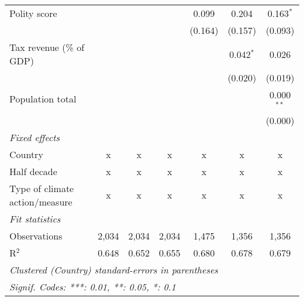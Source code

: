 \begin{tabular}{lcccccc}
   Polity score                                                   &               &                &                & 0.099          & 0.204          & 0.163$^{*}$\\   
                                                                  &               &                &                & (0.164)        & (0.157)        & (0.093)\\   
   Tax revenue (\% of GDP)                                        &               &                &                &                & 0.042$^{*}$    & 0.026\\   
                                                                  &               &                &                &                & (0.020)        & (0.019)\\   
   Population total                                               &               &                &                &                &                & 0.000$^{**}$\\   
                                                                  &               &                &                &                &                & (0.000)\\   
   \emph{Fixed effects}\\
   Country                                                        & x             & x              & x              & x              & x              & x\\  
   Half decade                                                    & x             & x              & x              & x              & x              & x\\  
   Type of climate action/measure                                 & x             & x              & x              & x              & x              & x\\  
   \midrule \emph{Fit statistics}\\
   Observations                                                   & 2,034         & 2,034          & 2,034          & 1,475          & 1,356          & 1,356\\  
   R$^2$                                                          & 0.648         & 0.652          & 0.655          & 0.680          & 0.678          & 0.679\\  
   \midrule
   \multicolumn{7}{l}{\emph{Clustered (Country) standard-errors in parentheses}}\\
   \multicolumn{7}{l}{\emph{Signif. Codes: ***: 0.01, **: 0.05, *: 0.1}}\\
\end{tabular}
\par\endgroup


